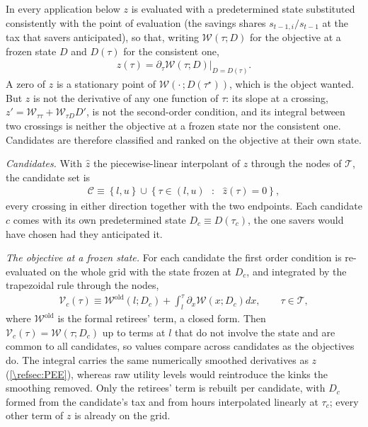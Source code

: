 In every application below $z$ is evaluated with a predetermined state substituted consistently with the point of evaluation (the savings shares $s_{t-1,i}/s_{t-1}$ at the tax that savers anticipated), so that, writing $\mathcal{W}(\tau; D)$ for the objective at a frozen state $D$ and $D(\tau)$ for the consistent one,
\begin{align}\label{\refeq:consistentFOC}
    z(\tau) = \partial_{\tau}\mathcal{W}\left(\tau; D\right)\big|_{D = D(\tau)}.
\end{align}
A zero of $z$ is a stationary point of $\mathcal{W}(\cdot\,; D(\tau^{\star}))$, which is the object wanted. But $z$ is not the derivative of any one function of $\tau$: its slope at a crossing, $z' = \mathcal{W}_{\tau\tau} + \mathcal{W}_{\tau D}D'$, is not the second-order condition, and its integral between two crossings is neither the objective at a frozen state nor the consistent one. Candidates are therefore classified and ranked on the objective at their own state.

\emph{Candidates.} With $\hat{z}$ the piecewise-linear interpolant of $z$ through the nodes of $\mathcal{T}$, the candidate set is
\begin{align}\label{\refeq:candidates}
    \mathcal{C} \equiv \left\lbrace l,u \right\rbrace\cup\left\lbrace \tau\in(l,u)\mbox{ }:\mbox{ }\hat{z}(\tau) = 0\right\rbrace,
\end{align}
every crossing in either direction together with the two endpoints. Each candidate $c$ comes with its own predetermined state $D_c \equiv D(\tau_c)$, the one savers would have chosen had they anticipated it.

\emph{The objective at a frozen state.} For each candidate the first order condition is re-evaluated on the whole grid with the state frozen at $D_c$, and integrated by the trapezoidal rule through the nodes,
\begin{align}\label{\refeq:objectiveProfile}
    \mathcal{V}_c(\tau) \equiv \mathcal{W}^{\mathrm{old}}\left(l; D_c\right) + \int_l^{\tau}\partial_{x}\mathcal{W}\left(x; D_c\right)dx, \qquad \tau\in\mathcal{T},
\end{align}
where $\mathcal{W}^{\mathrm{old}}$ is the formal retirees' term, a closed form. Then $\mathcal{V}_c(\tau) = \mathcal{W}(\tau; D_c)$ up to terms at $l$ that do not involve the state and are common to all candidates, so values compare across candidates as the objectives do. The integral carries the same numerically smoothed derivatives as $z$ (\cref{\refsec:PEE}), whereas raw utility levels would reintroduce the kinks the smoothing removed. Only the retirees' term is rebuilt per candidate, with $D_c$ formed from the candidate's tax and from hours interpolated linearly at $\tau_c$; every other term of $z$ is already on the grid.

